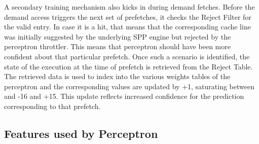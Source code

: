 \documentclass{sig-alternate}
\begin{document}
A secondary training mechanism also kicks in during demand fetches. Before the demand access triggers the next set of prefetches, it checks the Reject Filter for the valid entry. In case it is a hit, that means that the corresponding cache line was initially suggested by the underlying SPP engine but rejected by the perceptron throttler. This means that perceptron should have been more confident about that particular prefetch. Once such a scenario is identified, the state of the execution at the time of prefetch is retrieved from the Reject Table. The retrieved data is used to index into the various weights tables of the perceptron and the corresponding values are updated by +1, saturating between and -16 and +15. This update reflects increased confidence for the prediction corresponding to that prefetch.  

\subsection{Features used by Perceptron}
\end{document}
